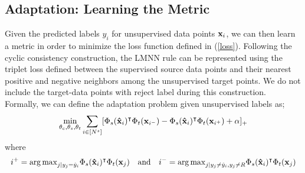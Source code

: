 \subsection{Adaptation: Learning the Metric}
\label{metric}
Given the predicted labels $y_i$ for unsupervised data points $\mathbf{x}_i$, we can then learn a metric in order to minimize the loss function defined in (\ref{loss}). Following the cyclic consistency construction, the LMNN rule can be represented using the triplet loss defined between the supervised source data points and their nearest positive and negative neighbors among the unsupervised target points. We do not include the target-data points with reject label during this construction. Formally, we can define the adaptation problem given unsupervised labels as;
\begin{equation}
\begin{aligned}
\min_{\theta_c,\theta_s,\theta_t} &\sum_{i \in [N^s]} [\Phi_s(\mathbf{\hat{x}}_i)^\intercal \Phi_t(\mathbf{x}_{i^-}) -\Phi_s(\mathbf{\hat{x}}_i)^\intercal \Phi_t(\mathbf{x}_{i^+}) + \alpha]_{+} \\
\end{aligned}
\end{equation}
where 
\begin{equation}
i^{+} = {\arg\max}_{j | y_j = \hat{y}_i} \Phi_s(\mathbf{\hat{x}}_i)^\intercal \Phi_t(\mathbf{x}_j) \quad  \text{and} \quad   i^{-} = {\arg\max}_{j | y_j \neq \hat{y}_i, y_j \neq R}  \Phi_s(\mathbf{\hat{x}}_i)^\intercal \Phi_t(\mathbf{x}_j)
\label{sup_nn}
\end{equation}


